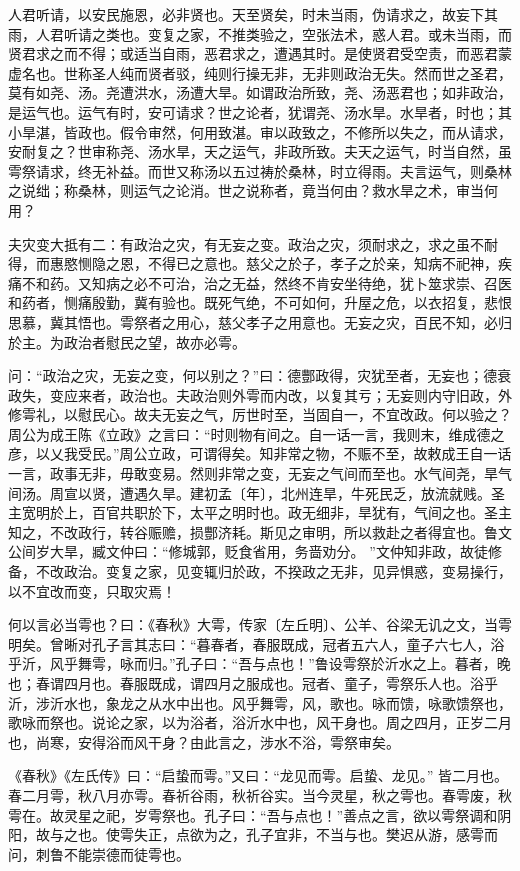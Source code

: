 \documentclass[]{article}
\begin{document}
人君听请，以安民施恩，必非贤也。天至贤矣，时未当雨，伪请求之，故妄下其雨，人君听请之类也。变复之家，不推类验之，空张法术，惑人君。或未当雨，而贤君求之而不得；或适当自雨，恶君求之，遭遇其时。是使贤君受空责，而恶君蒙虚名也。世称圣人纯而贤者驳，纯则行操无非，无非则政治无失。然而世之圣君，莫有如尧、汤。尧遭洪水，汤遭大旱。如谓政治所致，尧、汤恶君也；如非政治，是运气也。运气有时，安可请求？世之论者，犹谓尧、汤水旱。水旱者，时也；其小旱湛，皆政也。假令审然，何用致湛。审以政致之，不修所以失之，而从请求，安耐复之？世审称尧、汤水旱，天之运气，非政所致。夫天之运气，时当自然，虽雩祭请求，终无补益。而世又称汤以五过祷於桑林，时立得雨。夫言运气，则桑林之说绌；称桑林，则运气之论消。世之说称者，竟当何由？救水旱之术，审当何用？

夫灾变大抵有二：有政治之灾，有无妄之变。政治之灾，须耐求之，求之虽不耐得，而惠愍恻隐之恩，不得已之意也。慈父之於子，孝子之於亲，知病不祀神，疾痛不和药。又知病之必不可治，治之无益，然终不肯安坐待绝，犹卜筮求崇、召医和药者，恻痛殷勤，冀有验也。既死气绝，不可如何，升屋之危，以衣招复，悲恨思慕，冀其悟也。雩祭者之用心，慈父孝子之用意也。无妄之灾，百民不知，必归於主。为政治者慰民之望，故亦必雩。

问：``政治之灾，无妄之变，何以别之？''曰：德酆政得，灾犹至者，无妄也；德衰政失，变应来者，政治也。夫政治则外雩而内改，以复其亏；无妄则内守旧政，外修雩礼，以慰民心。故夫无妄之气，厉世时至，当固自一，不宜改政。何以验之？周公为成王陈《立政》之言曰：``时则物有间之。自一话一言，我则末，维成德之彦，以乂我受民。''周公立政，可谓得矣。知非常之物，不赈不至，故敕成王自一话一言，政事无非，毋敢变易。然则非常之变，无妄之气间而至也。水气间尧，旱气间汤。周宣以贤，遭遇久旱。建初孟〔年〕，北州连旱，牛死民乏，放流就贱。圣主宽明於上，百官共职於下，太平之明时也。政无细非，旱犹有，气间之也。圣主知之，不改政行，转谷赈赡，损酆济耗。斯见之审明，所以救赴之者得宜也。鲁文公间岁大旱，臧文仲曰：``修城郭，贬食省用，务啬劝分。
''文仲知非政，故徒修备，不改政治。变复之家，见变辄归於政，不揆政之无非，见异惧惑，变易操行，以不宜改而变，只取灾焉！

何以言必当雩也？曰：《春秋》大雩，传家〔左丘明〕、公羊、谷梁无讥之文，当雩明矣。曾晰对孔子言其志曰：``暮春者，春服既成，冠者五六人，童子六七人，浴乎沂，风乎舞雩，咏而归。''孔子曰：``吾与点也！''鲁设雩祭於沂水之上。暮者，晚也；春谓四月也。春服既成，谓四月之服成也。冠者、童子，雩祭乐人也。浴乎沂，涉沂水也，象龙之从水中出也。风乎舞雩，风，歌也。咏而馈，咏歌馈祭也，歌咏而祭也。说论之家，以为浴者，浴沂水中也，风干身也。周之四月，正岁二月也，尚寒，安得浴而风干身？由此言之，涉水不浴，雩祭审矣。

《春秋》《左氏传》曰：``启蛰而雩。''又曰：``龙见而雩。启蛰、龙见。''
皆二月也。春二月雩，秋八月亦雩。春祈谷雨，秋祈谷实。当今灵星，秋之雩也。春雩废，秋雩在。故灵星之祀，岁雩祭也。孔子曰：``吾与点也！''善点之言，欲以雩祭调和阴阳，故与之也。使雩失正，点欲为之，孔子宜非，不当与也。樊迟从游，感雩而问，刺鲁不能崇德而徒雩也。
\end{document}
